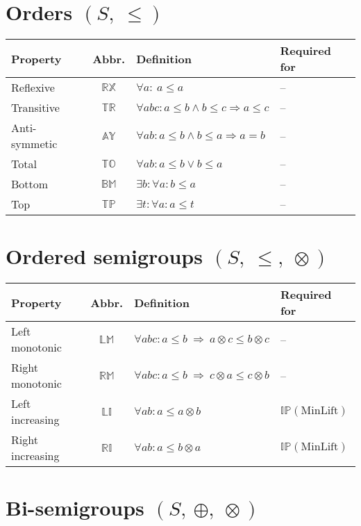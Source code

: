 \documentclass[10pt]{report}
\newcommand{\propname}[1]{{\mathbb{#1}}}
\begin{document}
\section{Orders $(S,\ \leq)$}

\begin{tabular}{lcll}
\toprule
Property & Abbr. & Definition & Required for \\
\midrule
Reflexive 		& $\propname{RX}$	& $\forall a : \ a \leq a $ & --\\
Transitive		& $\propname{TR}$	& $\forall a b c : a\leq b \wedge b \leq c \Rightarrow a \leq c $ & --\\
Anti-symmetic	& $\propname{AY}$	& $\forall a b : a\leq b \wedge b \leq a \Rightarrow a = b$ & --\\
Total			& $\propname{TO}$	& $\forall a b : a\leq b \vee  b\leq a$ & --\\
Bottom			& $\propname{BM}$	& $\exists b : \forall a : b\leq a$ & --\\
Top				& $\propname{TP}$	& $\exists t : \forall a : a\leq t$ & --\\
\bottomrule
\end{tabular}

\section{Ordered semigroups $(S,\ \leq,\ \otimes)$}

\begin{tabular}{lcll}
\toprule
Property & Abbr. & Definition & Required for \\
\midrule
Left monotonic		& $\propname{LM}$	& $\forall a b c : a\leq b \ \Rightarrow \ a \otimes c \leq b \otimes c$ & -- \\
Right monotonic		& $\propname{RM}$	& $\forall a b c : a\leq b \ \Rightarrow \ c \otimes a \leq c \otimes b$ & -- \\
\midrule
Left increasing		& $\propname{LI}$ 	& $\forall a b : a \leq a \otimes b$ & $\propname{IP}(\mathrm{MinLift})$ \\
Right increasing 	& $\propname{RI}$ 	& $\forall a b : a \leq b \otimes a$ & $\propname{IP}(\mathrm{MinLift})$ \\
\bottomrule
\end{tabular}

\section{Bi-semigroups $(S,\ \oplus,\ \otimes)$}
\end{document}
